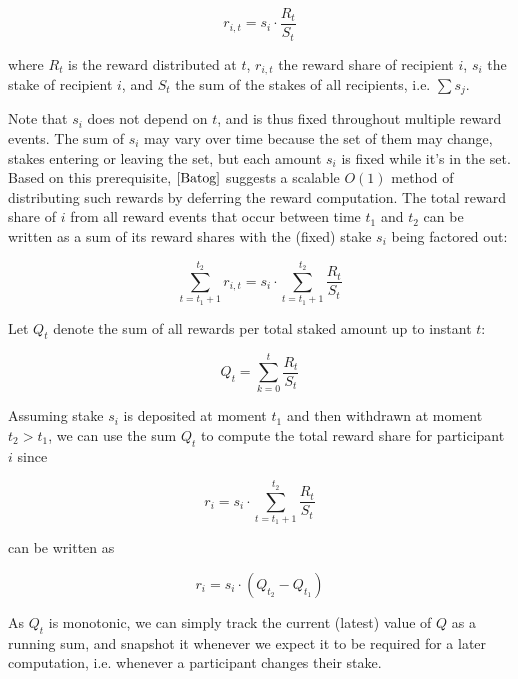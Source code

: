 \documentclass[reqno]{article}
\begin{document}
\begin{equation} 
    r_{i,t}=s_i \cdot \frac{R_t}{S_t}
\end{equation}

where $R_t$ is the reward distributed at $t$, $r_{i,t}$ the reward share of recipient $i$, $s_i$ the stake of recipient $i$, and $S_t$ the sum of the stakes of all recipients, i.e. $\sum s_j$.

Note that $s_i$ does not depend on $t$, and is thus fixed throughout multiple reward events. The sum of $s_i$ may vary over time because the set of them may change, stakes entering or leaving the set, but each amount $s_i$ is fixed while it’s in the set. \\

Based on this prerequisite, $\cite{Batog}$ suggests a scalable $O(1)$ method of distributing such rewards by deferring the reward computation. The total reward share of $i$ from all reward events that occur between time $t_1$ and $t_2$ can be written as a sum of its reward shares with the (fixed) stake $s_i$ being factored out:

\begin{equation}
    \sum\limits_{t=t_1+1}^{t_2} r_{i,t} = s_i \cdot \sum\limits_{t=t_1+1}^{t_2}\frac{R_t}{S_t}
\end{equation}

Let $Q_t$ denote the sum of all rewards per total staked amount up to instant $t$:

\begin{equation}
   Q_t = \sum\limits_{k=0}^{t}\frac{R_t}{S_t}
\end{equation}

Assuming stake $s_i$ is deposited at moment $t_1$ and then
withdrawn at moment $t_2 > t_1$, we can use the sum $Q_t$ to
compute the total reward share for participant $i$ since


\begin{equation} 
    r_i = s_i \cdot \sum\limits_{t=t_1+1}^{t_2}\frac{R_t}{S_t}
\end{equation}

can be written as

\begin{equation} 
    r_i = s_i \cdot (Q_{t_2} - Q_{t_1})
\end{equation}

As $Q_t$ is monotonic, we can simply track the current (latest)
value of $Q$ as a running sum, and snapshot it whenever we expect it to be required for a later computation, i.e. whenever a participant changes their stake.
\end{document}
